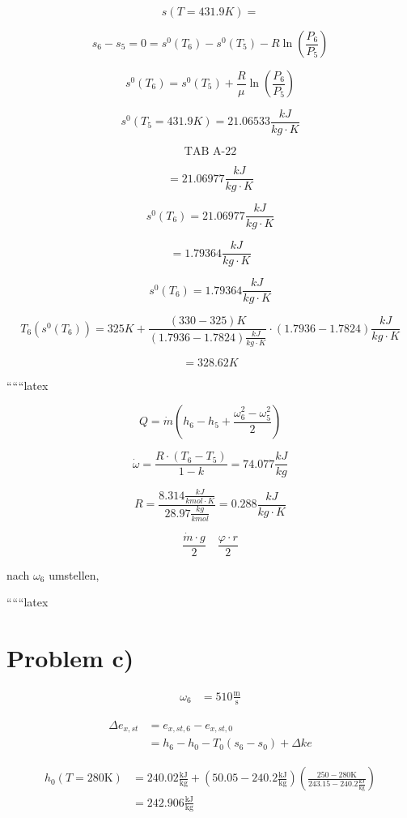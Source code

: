 \[
s(T = 431.9K) =
\]

\[
s_6 - s_5 = 0 = s^0(T_6) - s^0(T_5) - R \ln \left( \frac{P_6}{P_5} \right)
\]

\[
s^0(T_6) = s^0(T_5) + \frac{R}{\mu} \ln \left( \frac{P_6}{P_5} \right)
\]

\[
s^0(T_5 = 431.9K) = 21.06533 \frac{kJ}{kg \cdot K}
\]

\[
\text{TAB A-22}
\]

\[
= 21.06977 \frac{kJ}{kg \cdot K}
\]

\[
s^0(T_6) = 21.06977 \frac{kJ}{kg \cdot K}
\]

\[
= 1.79364 \frac{kJ}{kg \cdot K}
\]

\[
s^0(T_6) = 1.79364 \frac{kJ}{kg \cdot K}
\]

\[
T_6(s^0(T_6)) = 325K + \frac{(330 - 325)K}{(1.7936 - 1.7824) \frac{kJ}{kg \cdot K}} \cdot (1.7936 - 1.7824) \frac{kJ}{kg \cdot K}
\]

\[
= 328.62K
\]

``````latex


\[
Q = \dot{m} \left( h_6 - h_5 + \frac{\omega_6^2 - \omega_5^2}{2} \right)
\]

\[
\dot{\omega} = \frac{R \cdot (T_6 - T_5)}{1 - k} = 74.077 \frac{kJ}{kg}
\]

\[
R = \frac{8.314 \frac{kJ}{kmol \cdot K}}{28.97 \frac{kg}{kmol}} = 0.288 \frac{kJ}{kg \cdot K}
\]

\[
\frac{\dot{m} \cdot g}{2} \quad \frac{\varphi \cdot r}{2}
\]

nach \( \omega_6 \) umstellen,

``````latex


\section*{Problem c)}

\begin{align*}
    \omega_6 &= 510 \frac{\text{m}}{\text{s}}
\end{align*}


\begin{align*}
    \Delta e_{x,st} &= e_{x,st,6} - e_{x,st,0} \\
    &= h_6 - h_0 - T_0 (s_6 - s_0) + \Delta k e
\end{align*}

\begin{align*}
    h_0 (T = 280 \text{K}) &= 240.02 \frac{\text{kJ}}{\text{kg}} + \left( 50.05 - 240.2 \frac{\text{kJ}}{\text{kg}} \right) \left( \frac{250 - 280 \text{K}}{243.15 - 240.2 \frac{\text{kJ}}{\text{kg}}} \right) \\
    &= 242.906 \frac{\text{kJ}}{\text{kg}}
\end{align*}

